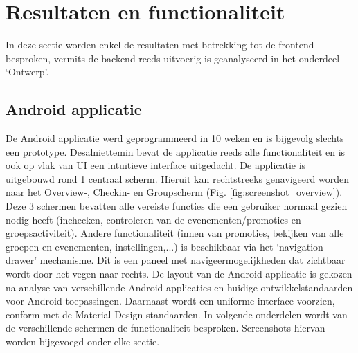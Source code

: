 
\chapter{Resultaten en functionaliteit}
In deze sectie worden enkel de resultaten met betrekking tot de frontend besproken, vermits de backend reeds uitvoerig is geanalyseerd in het onderdeel `Ontwerp'.
\section{Android applicatie}
De Android applicatie werd geprogrammeerd in 10 weken en is bijgevolg slechts een prototype. Desalniettemin bevat de applicatie reeds alle functionaliteit en is ook op vlak van UI een intuïtieve interface uitgedacht.
De applicatie is uitgebouwd rond 1 centraal scherm. Hieruit kan rechtstreeks genavigeerd worden naar het Overview-, Checkin- en Groupscherm (Fig. \ref{fig:screenshot_overview}). Deze 3 schermen bevatten alle vereiste functies die een gebruiker normaal gezien nodig heeft (inchecken, controleren van de evenementen/promoties en groepsactiviteit). Andere functionaliteit (innen van promoties, bekijken van alle groepen en evenementen, instellingen,...) is beschikbaar via het `navigation drawer' mechanisme. Dit is een paneel met navigeermogelijkheden dat zichtbaar wordt door het vegen naar rechts. De layout van de Android applicatie is gekozen na analyse van verschillende Android applicaties en huidige ontwikkelstandaarden voor Android toepassingen. Daarnaast wordt een uniforme interface voorzien, conform met de Material Design standaarden. In volgende onderdelen wordt van de verschillende schermen de functionaliteit besproken. Screenshots hiervan worden bijgevoegd onder elke sectie.

